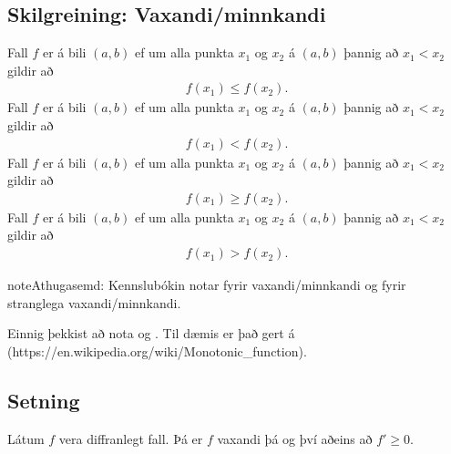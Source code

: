 \documentclass[a4paper,10pt,icelandic]{sphinxmanual}
\begin{document}
\subsection{Skilgreining: Vaxandi/minnkandi}
\label{\detokenize{kafli03:skilgreining-vaxandi-minnkandi}}\label{\detokenize{kafli03:index-9}}
Fall \(f\) er  á bili \((a,b)\) ef um
alla punkta \(x_1\) og \(x_2\) á \((a,b)\) þannig að
\(x_1 < x_2\) gildir að
\begin{equation*}
\begin{split}f(x_1) \leq f(x_2).\end{split}
\end{equation*}
Fall \(f\) er  á bili \((a,b)\)
ef um alla punkta \(x_1\) og \(x_2\) á \((a,b)\) þannig að
\(x_1 < x_2\) gildir að
\begin{equation*}
\begin{split}f(x_1) < f(x_2).\end{split}
\end{equation*}
Fall \(f\) er  á bili \((a,b)\) ef um
alla punkta \(x_1\) og \(x_2\) á \((a,b)\) þannig að
\(x_1 < x_2\) gildir að
\begin{equation*}
\begin{split}f(x_1) \geq f(x_2).\end{split}
\end{equation*}
Fall \(f\) er  á bili
\((a,b)\) ef um alla punkta \(x_1\) og \(x_2\) á
\((a,b)\) þannig að \(x_1 < x_2\) gildir að
\begin{equation*}
\begin{split}f(x_1) > f(x_2).\end{split}
\end{equation*}
\begin{sphinxadmonition}{note}{Athugasemd:}
Kennslubókin notar  fyrir vaxandi/minnkandi og
 fyrir stranglega vaxandi/minnkandi.

Einnig þekkist að nota  og .
Til dæmis er það gert á  (https://en.wikipedia.org/wiki/Monotonic\_function).
\end{sphinxadmonition}


\subsection{Setning}
\label{\detokenize{kafli03:id15}}\label{\detokenize{kafli03:vaxandieoae}}
Látum \(f\) vera diffranlegt fall. Þá er \(f\) vaxandi þá og því
aðeins að \(f' \geq 0\).
\end{document}

